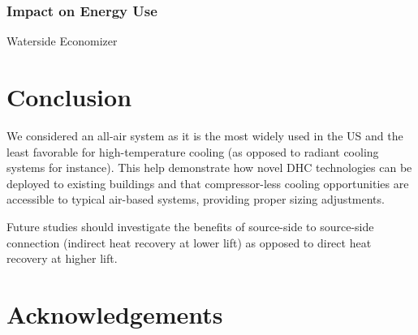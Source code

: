 \subsubsection{Impact on Energy Use} \label{sec:energy}

Waterside Economizer







\section{Conclusion} \label{sec:concl}

We considered an all-air system as it is the most widely used in the US and the least favorable for high-temperature cooling (as opposed to radiant cooling systems for instance).
This help demonstrate how novel DHC technologies can be deployed to existing buildings and that compressor-less cooling opportunities are accessible to typical air-based systems, providing proper sizing adjustments.

Future studies should investigate the benefits of source-side to source-side connection (indirect heat recovery at lower lift) as opposed to direct heat recovery at higher lift.

\section{Acknowledgements} \label{sec:acknowledge}
